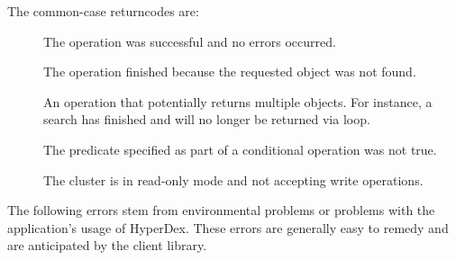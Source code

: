 The common-case returncodes are:

\begin{description}
\item[]  The operation was successful and no
    errors occurred.
\item[]  The operation finished because the
    requested object was not found.
\item[]  An operation that potentially
    returns multiple objects.  For instance, a search has
    finished and will no longer be returned via loop.
\item[]  The predicate specified as part of a
    conditional operation was not true.
\item[] The cluster is in read-only mode and
    not accepting write operations.
\end{description}

The following errors stem from environmental problems or problems with the
application's usage of HyperDex.  These errors are generally easy to remedy and
are anticipated by the client library.

